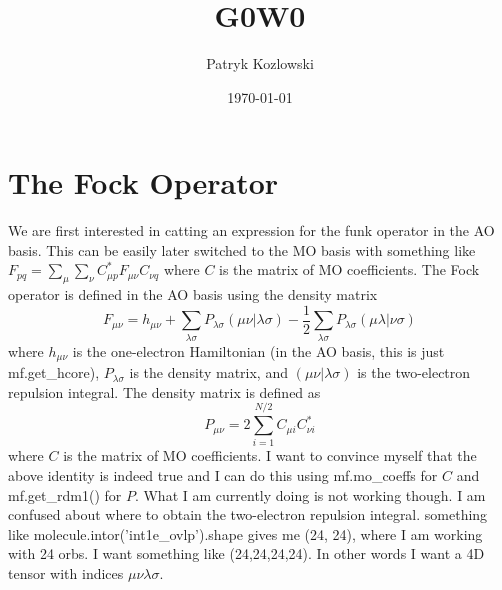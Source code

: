 \documentclass[12pt]{article}
\author{Patryk Kozlowski}
\title{G0W0}
\date{\today}
\begin{document}
\maketitle
\section{The Fock Operator}
We are first interested in catting an expression for the funk operator in the AO basis. This can be easily later switched to the MO basis with something like $F_{pq} = \sum_{\mu} \sum_{\nu} C_{\mu p}^{*}F_{\mu\nu}C_{\nu q}$ where $C$ is the matrix of MO coefficients. The Fock operator is defined in the AO basis using the density matrix 
\begin{equation}
F_{\mu\nu} = h_{\mu\nu} + \sum_{\lambda\sigma}P_{\lambda\sigma}(\mu\nu|\lambda\sigma) - \frac{1}{2}\sum_{\lambda\sigma}P_{\lambda\sigma}(\mu\lambda|\nu\sigma)
\end{equation}
where $h_{\mu\nu}$ is the one-electron Hamiltonian (in the AO basis, this is just mf.get\_hcore), $P_{\lambda\sigma}$ is the density matrix, and $(\mu\nu|\lambda\sigma)$ is the two-electron repulsion integral. The density matrix is defined as
\begin{equation}
P_{\mu\nu} = 2\sum_{i=1}^{N/2}C_{\mu i}C_{\nu i}^{*}
\end{equation}
where $C$ is the matrix of MO coefficients. I want to convince myself that the above identity is indeed true and I can do this using mf.mo\_coeffs for $C$ and mf.get\_rdm1() for $P$. What I am currently doing is not working though.
I am confused about where to obtain the two-electron repulsion integral. something like molecule.intor('int1e\_ovlp').shape gives me (24, 24), where I am working with 24 orbs. I want something like (24,24,24,24). In other words I want  a 4D tensor with indices $\mu\nu\lambda\sigma$.
\end{document}
